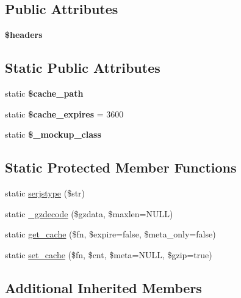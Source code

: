 \subsection*{Public Attributes}
\begin{DoxyCompactItemize}
\item 
\mbox{\label{classduzun_1_1hQuery_a83d15ffbefcbf2459bf50bb10ed79514}} 
{\bfseries \$headers}
\end{DoxyCompactItemize}
\subsection*{Static Public Attributes}
\begin{DoxyCompactItemize}
\item 
\mbox{\label{classduzun_1_1hQuery_a2a97f056a6ce83b7c6016e25cf2538e4}} 
static {\bfseries \$cache\+\_\+path}
\item 
\mbox{\label{classduzun_1_1hQuery_a34e4d9410985fd7cde08ba84892084e3}} 
static {\bfseries \$cache\+\_\+expires} = 3600
\item 
\mbox{\label{classduzun_1_1hQuery_af47ffc7fdf974e3e0d109f426be39a74}} 
static {\bfseries \$\+\_\+mockup\+\_\+class}
\end{DoxyCompactItemize}
\subsection*{Static Protected Member Functions}
\begin{DoxyCompactItemize}
\item 
static \mbox{\hyperlink{classduzun_1_1hQuery_ac01b0ddd586fe833f61c733147231a47}{serjstype}} (\$str)
\item 
static \mbox{\hyperlink{classduzun_1_1hQuery_a91deb0634713a3471cd5101b8b66b579}{\+\_\+gzdecode}} (\$gzdata, \$maxlen=N\+U\+LL)
\item 
static \mbox{\hyperlink{classduzun_1_1hQuery_a3b0cda49e9c7695c2fc88f3ad1657c61}{get\+\_\+cache}} (\$fn, \$expire=false, \$meta\+\_\+only=false)
\item 
static \mbox{\hyperlink{classduzun_1_1hQuery_a9e61ec098daddf504ffc239ff7d7910f}{set\+\_\+cache}} (\$fn, \$cnt, \$meta=N\+U\+LL, \$gzip=true)
\end{DoxyCompactItemize}
\subsection*{Additional Inherited Members}


